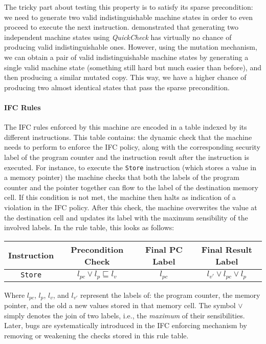 \documentclass[sigconf, anonymous, review]{acmart}
\newcommand{\quickcheck}{\textit{QuickCheck}\xspace}
\begin{document}
The tricky part about testing this property is to satisfy its sparse
precondition: we need to generate two valid indistinguishable machine states in
order to even proceed to execute the next instruction.
%
\citeauthor{lampropoulos2019coverage} demonstrated that generating two
independent machine states using \quickcheck has virtually no chance of
producing valid indistinguishable ones.
%
However, using the mutation mechanism, we can obtain a pair of valid
indistinguishable machine states by generating a single valid machine state
(something still hard but much easier than before), and then producing a similar
mutated copy.
%
This way, we have a higher chance of producing two almost identical states that
pass the sparse precondition.

\paragraph{IFC Rules}

The IFC rules enforced by this machine are encoded in a table indexed by its
different instructions.
%
This table contains: the dynamic check that the machine needs to perform to
enforce the IFC policy, along with the corresponding security label of the
program counter and the instruction result after the instruction is executed.
%
For instance, to execute the \texttt{Store} instruction (which stores a value in
a memory pointer) the machine checks that both the labels of the program counter
and the pointer together can flow to the label of the destination memory cell.
%
If this condition is not met, the machine then halts as indication of a
violation in the IFC policy.
%
After this check, the machine overwrites the value at the destination cell and
updates its label with the maximum sensibility of the involved labels.
%
In the rule table, this looks as follows:

\begin{center}
\scriptsize
\begin{tabular}{|c|c|c|c|}
\hline
\textbf{Instruction}
& \textbf{Precondition Check}
& \textbf{Final PC Label}
& \textbf{Final Result Label} \\
\hline
\texttt{Store}
& $l_{pc} \vee l_{p} \sqsubseteq l_{v}$
& $l_{pc}$
& $l_{v'} \vee l_{pc} \vee l_{p}$ \\
\hline
\end{tabular}
\end{center}

\noindent Where $l_{pc}$, $l_{p}$, $l_{v}$, and $l_{v'}$ represent the labels
of: the program counter, the memory pointer, and the old a new values stored in
that memory cell.
%
The symbol $\vee$ simply denotes the join of two labels, i.e., the
\emph{maximum} of their sensibilities.
%
Later, bugs are systematically introduced in the IFC enforcing mechanism by
removing or weakening the checks stored in this rule table.
\end{document}
